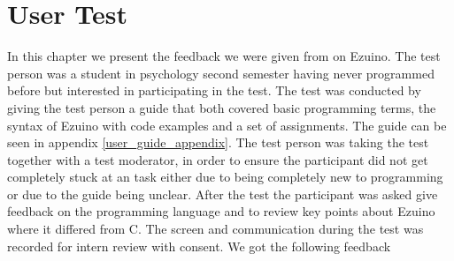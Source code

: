 \section{User Test}
In this chapter we present the feedback we were given from on Ezuino. The test person was a student in psychology second semester having never programmed before but interested in participating in the test. The test was conducted by giving the test person a guide that both covered basic programming terms, the syntax of Ezuino with code examples and a set of assignments. The guide can be seen in appendix \ref{user_guide_appendix}. The test person was taking the test together with a test moderator, in order to ensure the participant did not get completely stuck at an task either due to being completely new to programming or due to the guide being unclear. After the test the participant was asked give feedback on the programming language and to review key points about Ezuino where it differed from C. The screen and communication during the test was recorded for intern review with consent.
We got the following feedback
